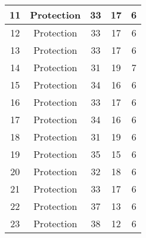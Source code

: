 \documentclass[results.tex]{subfiles}
\begin{document}
\begin{center}
\begin{tabular}{| c || c | c | c | c |}
            \hline
            11                      & Protection                   & 33                     & 17                      & 6                    \\
            \hline
            12                      & Protection                   & 33                     & 17                      & 6                    \\
            \hline
            13                      & Protection                   & 33                     & 17                      & 6                    \\
            \hline
            14                      & Protection                   & 31                     & 19                      & 7                    \\
            \hline
            15                      & Protection                   & 34                     & 16                      & 6                    \\
            \hline
            16                      & Protection                   & 33                     & 17                      & 6                    \\
            \hline
            17                      & Protection                   & 34                     & 16                      & 6                    \\
            \hline
            18                      & Protection                   & 31                     & 19                      & 6                    \\
            \hline
            19                      & Protection                   & 35                     & 15                      & 6                    \\
            \hline
            20                      & Protection                   & 32                     & 18                      & 6                    \\
            \hline
            21                      & Protection                   & 33                     & 17                      & 6                    \\
            \hline
            22                      & Protection                   & 37                     & 13                      & 6                    \\
            \hline
            23                      & Protection                   & 38                     & 12                      & 6                    \\

\end{tabular}
\end{center}
\end{document}
